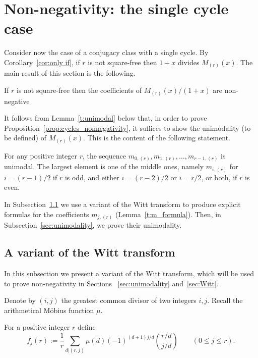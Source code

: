 \section{Non-negativity: the single cycle case}
\label{sec:cycles}

Consider now the case of a conjugacy class with a single cycle.
By Corollary~\ref{cor:only if}, if $r$ is not square-free then $1+x$ divides $M_{(r)}(x)$. 
The main result of this section is the following. 

\begin{proposition}\label{prop:cycles_nonnegativity}
    If $r$ is not square-free then the coefficients of $M_{(r)}(x)/(1+x)$ are non-negative
\end{proposition}
		
It follows from Lemma~\ref{t:unimodal} below that, in order to prove Proposition~\ref{prop:cycles_nonnegativity}, it suffices to show the unimodality (to be defined) of $M_{(r)}(x)$. This is the content of the following statement.
		 
\begin{proposition}\label{prop:s=1_unimodal}
    For any positive integer $r$, the sequence $m_{0,(r)}, m_{1,(r)},\ldots, m_{r-1,(r)}$ is unimodal.
    The largest element is one of the middle ones, namely $m_{i,(r)}$ for $i = (r-1)/2$ if $r$ is odd, and either $i = (r-2)/2$ or $i = r/2$, or both, if $r$ is even.
\end{proposition}

In Subsection~\ref{sec:Witt-subsec} we use a variant of the Witt transform to produce explicit formulas for the coefficients $m_{j,(r)}$ (Lemma~\ref{t:m_formula}).
Then, in Subsection~\ref{sec:unimodality}, we prove their unimodality.


\subsection{A variant of the Witt transform}
\label{sec:Witt-subsec}
 
In this subsection we present a variant of the Witt transform, which will be used to prove non-negativity in Sections ~\ref{sec:unimodality} and~\ref{sec:Witt}.
    
Denote by $(i,j)$ the greatest common divisor of two integers $i,j$. Recall the arithmetical M\"obius function $\mu$. 
    
\begin{definition}\label{def:f}
    For a positive integer $r$ define 
    \[
        f_j(r) 
        := \frac{1}{r} \sum_{d|(r,j)} \mu(d)(-1)^{(d+1)j/d} \binom{r/d}{j/d} 
	   \qquad (0\le j\le r). 
    \]
\end{definition}
   
